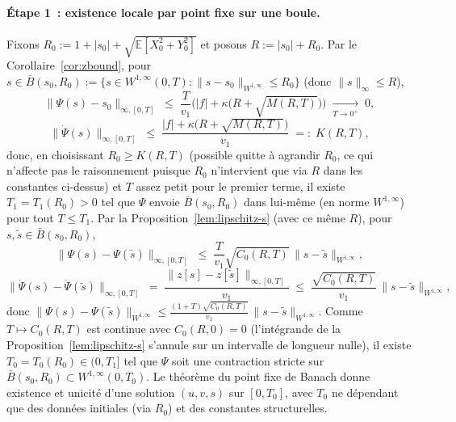 \documentclass[11pt,a4paper]{article}
\newcommand{\E}{\mathbb{E}}
\theoremstyle{plain}
\theoremstyle{definition}
\begin{document}
\paragraph{\'Etape 1~: existence locale par point fixe sur une boule.} Fixons $R_0:=1+|s_0|+\sqrt{\E[X_0^2+Y_0^2]}$ et posons $R:=|s_0|+R_0$. Par le Corollaire~\ref{cor:zbound}, pour $s\in \bar B(s_0,R_0):=\{s\in W^{1,\infty}(0,T):\|s-s_0\|_{W^{1,\infty}}\le R_0\}$ (donc $\|s\|_\infty\le R$),
\[
\|\Psi(s)-s_0\|_{\infty,[0,T]} \;\le\; \frac{T}{v_1}\Big(|f|+\kappa\big(R+\sqrt{M(R,T)}\big)\Big) \;\xrightarrow[T\to0^+]{}\; 0,
\]
\[
\|\dot\Psi(s)\|_{\infty,[0,T]} \;\le\; \frac{|f|+\kappa\big(R+\sqrt{M(R,T)}\big)}{v_1} \;=:\; K(R,T),
\]
donc, en choisissant $R_0\ge K(R,T)$ (possible quitte \`a agrandir $R_0$, ce qui n'affecte pas le raisonnement puisque $R_0$ n'intervient que via $R$ dans les constantes ci-dessus) et $T$ assez petit pour le premier terme, il existe $T_1=T_1(R_0)>0$ tel que $\Psi$ envoie $\bar B(s_0,R_0)$ dans lui-m\^eme (en norme $W^{1,\infty}$) pour tout $T\le T_1$. Par la Proposition~\ref{lem:lipschitz-s} (avec ce m\^eme $R$), pour $s,\tilde s\in\bar B(s_0,R_0)$,
\[
\|\Psi(s)-\Psi(\tilde s)\|_{\infty,[0,T]} \;\le\; \frac{T}{v_1}\sqrt{C_0(R,T)}\,\|s-\tilde s\|_{W^{1,\infty}},
\]
\[
\|\dot\Psi(s)-\dot\Psi(\tilde s)\|_{\infty,[0,T]} \;=\; \frac{\|z[s]-z[\tilde s]\|_{\infty,[0,T]}}{v_1} \;\le\; \frac{\sqrt{C_0(R,T)}}{v_1}\,\|s-\tilde s\|_{W^{1,\infty}},
\]
donc $\|\Psi(s)-\Psi(\tilde s)\|_{W^{1,\infty}} \le \frac{(1+T)\sqrt{C_0(R,T)}}{v_1}\,\|s-\tilde s\|_{W^{1,\infty}}$. Comme $T\mapsto C_0(R,T)$ est continue avec $C_0(R,0)=0$ (l'int\'egrande de la Proposition~\ref{lem:lipschitz-s} s'annule sur un intervalle de longueur nulle), il existe $T_0=T_0(R_0)\in(0,T_1]$ tel que $\Psi$ soit une contraction stricte sur $\bar B(s_0,R_0)\subset W^{1,\infty}(0,T_0)$. Le th\'eor\`eme du point fixe de Banach donne existence et unicit\'e d'une solution $(u,v,s)$ sur $[0,T_0]$, avec $T_0$ ne d\'ependant que des donn\'ees initiales (via $R_0$) et des constantes structurelles.
\end{document}
